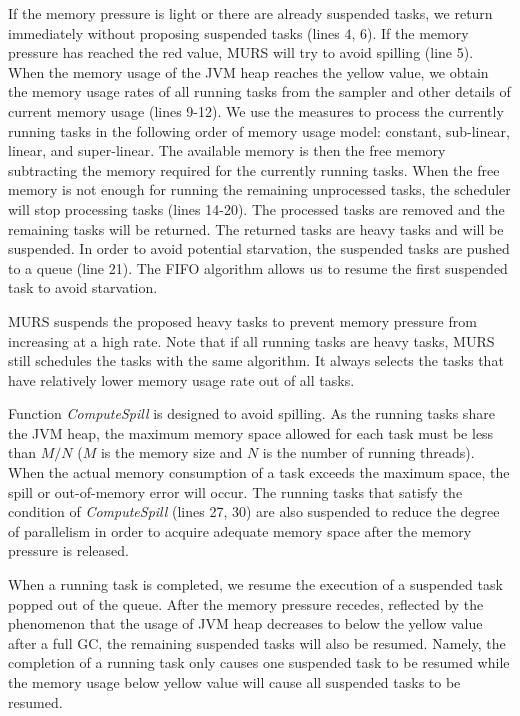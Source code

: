 If the memory pressure is light or there are already suspended tasks, we return immediately without proposing suspended tasks (lines 4, 6). If the memory pressure has reached the red value, MURS will try to avoid spilling (line 5). When the memory usage of the JVM heap reaches the yellow value, we obtain the memory usage rates of all running tasks from the sampler and other details of current memory usage (lines 9-12). We use the measures to process the currently running tasks in the following order of memory usage model: constant, sub-linear, linear, and super-linear. The available memory is then the free memory subtracting the memory required for the currently running tasks. When the free memory is not enough for running the remaining unprocessed tasks, the scheduler will stop processing tasks (lines 14-20). 
The processed tasks are removed and the remaining tasks will be returned. The returned tasks are heavy tasks and will be suspended. In order to avoid potential starvation, the suspended tasks are pushed to a queue (line 21). The FIFO algorithm allows us to resume the first suspended task to avoid starvation. 

MURS suspends the proposed heavy tasks to prevent memory pressure from increasing at a high rate. Note that if all running tasks are heavy tasks, MURS still schedules the tasks with the same algorithm. It always selects the tasks that have relatively lower memory usage rate out of all tasks. 

Function \textit{ComputeSpill} is designed to avoid spilling. As the running tasks share the JVM heap, the maximum memory space allowed for each task must be less than $M/N$ ($M$ is the memory size and $N$ is the number of running threads). When the actual memory consumption of a task exceeds the maximum space, the spill or out-of-memory error will occur. The running tasks that satisfy the condition of \textit{ComputeSpill} (lines 27, 30) are also suspended to reduce the degree of parallelism in order to acquire adequate memory space after the memory pressure is released.   

When a running task is completed, we resume the execution of a suspended task popped out of the queue. After the memory pressure recedes, reflected by the phenomenon that the usage of JVM heap decreases to below the yellow value after a full GC, the remaining suspended tasks will also be resumed. Namely, the completion of a running task only causes one suspended task to be resumed while the memory usage below yellow value will cause all suspended tasks to be resumed.

